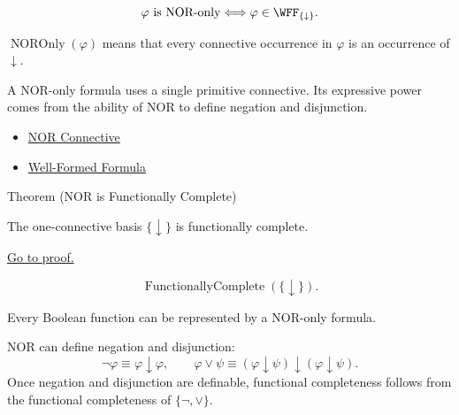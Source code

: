\begin{remark*}
\[
\varphi\text{ is NOR-only}
\Longleftrightarrow
\varphi\in\WFF_{\{\downarrow\}}.
\]
\end{remark*}

\begin{remark*}
\(\operatorname{NOROnly}(\varphi)\) means that every connective occurrence in
\(\varphi\) is an occurrence of \(\downarrow\).
\end{remark*}

\begin{remark*}[Interpretation]
A NOR-only formula uses a single primitive connective. Its expressive power
comes from the ability of NOR to define negation and disjunction.
\end{remark*}

\begin{dependencies}
\begin{itemize}
  \item \hyperref[def:nor-connective-propositional-logic]{NOR Connective}
  \item \hyperref[def:well-formed-formula]{Well-Formed Formula}
\end{itemize}
\end{dependencies}

\begin{theorembox}{Theorem (NOR is Functionally Complete)}
\begin{theorem}
\label{thm:nor-functionally-complete-propositional-logic}
The one-connective basis \(\{\downarrow\}\) is functionally complete.

\noindent\hyperref[prf:nor-functionally-complete-propositional-logic]{Go to proof.}
\end{theorem}
\end{theorembox}

\begin{remark*}
\[
\operatorname{FunctionallyComplete}(\{\downarrow\}).
\]
\end{remark*}

\begin{remark*}
Every Boolean function can be represented by a NOR-only formula.
\end{remark*}

\begin{remark*}[Interpretation]
NOR can define negation and disjunction:
\[
\neg\varphi\equiv\varphi\downarrow\varphi,
\qquad
\varphi\lor\psi\equiv(\varphi\downarrow\psi)\downarrow(\varphi\downarrow\psi).
\]
Once negation and disjunction are definable, functional completeness follows
from the functional completeness of \(\{\neg,\lor\}\).
\end{remark*}

